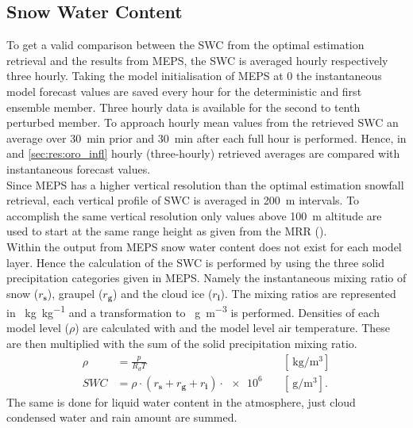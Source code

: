 \subsection{Snow Water Content}
To get a valid comparison between the SWC from the optimal estimation retrieval and the results from MEPS, the SWC is averaged hourly respectively three hourly. Taking the model initialisation of MEPS at \SI{0}{\UTC} the instantaneous model forecast values are saved every hour for the deterministic and first ensemble member. Three hourly data is available for the second to tenth perturbed member. To approach hourly mean values from the retrieved SWC an average over \SI{30}{\minute} prior and \SI{30}{\minute} after each full hour is performed. %
Hence, in  and \ref{sec:res:oro_infl} hourly (three-hourly) retrieved averages are compared with instantaneous forecast values.
\\
Since MEPS has a higher vertical resolution than the optimal estimation snowfall retrieval, each vertical profile of SWC is averaged in \SI{200}{\metre} intervals. To accomplish the same vertical resolution only values above \SI{100}{\metre} altitude are used to start at the same range height as given from the MRR ().
\\
Within the output from MEPS snow water content does not exist for each model layer. Hence the calculation of the SWC is performed by using the three solid precipitation categories given in MEPS. Namely the instantaneous mixing ratio of snow ($r_\mathbf{s}$), graupel  ($r_\mathbf{g}$) and the cloud ice ($r_\mathbf{i}$). The mixing ratios are represented in \SI{}{\kg\per\kg} and a transformation to \SI{}{\g\per\cubic\meter} is performed. Densities of each model level ($\rho$) are calculated with  and the model level air temperature. These are then multiplied with the sum of the solid precipitation mixing ratio. 
\begin{align}
\rho & = \frac{p}{R_d T} & \quad [\SI{}{\kg\per\cubic\meter}]  \\
SWC & = \rho \cdot (r_\mathbf{s} + r_\mathbf{g} + r_\mathbf{i}) \cdot \num{e6} & \quad [\SI{}{\g\per\cubic\meter}].
\label{eq:SWC_ml}
\end{align}
The same is done for liquid water content in the atmosphere, just cloud condensed water and rain amount are summed.

